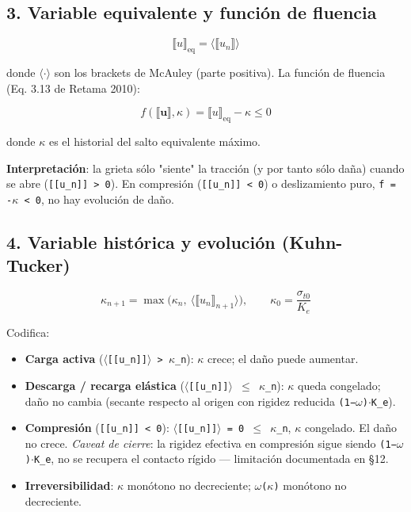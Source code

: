\documentclass[11pt,letterpaper,oneside]{report}
\begin{document}
\subsection{3. Variable equivalente y función de fluencia}

\[
\llbracket u\rrbracket_\text{eq} = \langle\llbracket u_n\rrbracket\rangle
\]

donde \texttt{\ensuremath{\langle}\ensuremath{\cdot}\ensuremath{\rangle}} son los brackets de McAuley (parte positiva). La función de fluencia (Eq. 3.13 de Retama 2010):

\[
f(\llbracket\mathbf u\rrbracket, \kappa) = \llbracket u\rrbracket_\text{eq} - \kappa \leq 0
\]

donde \texttt{\ensuremath{\kappa}} es el historial del salto equivalente máximo.

\textbf{Interpretación}: la grieta sólo "siente" la tracción (y por tanto sólo daña) cuando se abre (\texttt{[[u\_n]] > 0}). En compresión (\texttt{[[u\_n]] < 0}) o deslizamiento puro, \texttt{f = -\ensuremath{\kappa} < 0}, no hay evolución de daño.

\subsection{4. Variable histórica y evolución (Kuhn-Tucker)}

\[
\kappa_{n+1} = \max\bigl(\kappa_n,\ \langle\llbracket u_n\rrbracket_{n+1}\rangle\bigr), \qquad \kappa_0 = \frac{\sigma_{t0}}{K_e}
\]

Codifica:

\begin{itemize}
  \item \textbf{Carga activa} (\texttt{\ensuremath{\langle}[[u\_n]]\ensuremath{\rangle} > \ensuremath{\kappa}\_n}): \texttt{\ensuremath{\kappa}} crece; el daño puede aumentar.
  \item \textbf{Descarga / recarga elástica} (\texttt{\ensuremath{\langle}[[u\_n]]\ensuremath{\rangle} \ensuremath{\le} \ensuremath{\kappa}\_n}): \texttt{\ensuremath{\kappa}} queda congelado; daño no cambia (secante respecto al origen con rigidez reducida \texttt{(1−\ensuremath{\omega})\ensuremath{\cdot}K\_e}).
  \item \textbf{Compresión} (\texttt{[[u\_n]] < 0}): \texttt{\ensuremath{\langle}[[u\_n]]\ensuremath{\rangle} = 0 \ensuremath{\le} \ensuremath{\kappa}\_n}, \texttt{\ensuremath{\kappa}} congelado. El daño no crece. \textit{Caveat de cierre}: la rigidez efectiva en compresión sigue siendo \texttt{(1−\ensuremath{\omega})\ensuremath{\cdot}K\_e}, no se recupera el contacto rígido --- limitación documentada en §12.
  \item \textbf{Irreversibilidad}: \texttt{\ensuremath{\kappa}} monótono no decreciente; \texttt{\ensuremath{\omega}(\ensuremath{\kappa})} monótono no decreciente.
\end{itemize}
\end{document}
